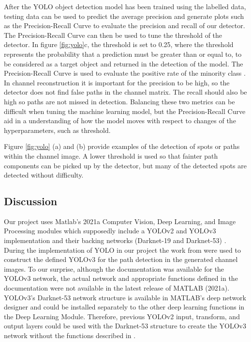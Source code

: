 After the YOLO object detection model has been trained using the labelled data, testing data can be used to predict the average precision and generate plots such as the Precision-Recall Curve to evaluate the precision and recall of our detector. The Precision-Recall Curve can then be used to tune the threshold of the detector. In figure \ref{fig:yolo}c, the threshold is set to 0.25, where the threshold represents the probability that a prediction must be greater than or equal to, to be considered as a target object and returned in the detection of the model. The Precision-Recall Curve is used to evaluate the positive rate of the minority class \cite{Burkov2019}. In channel reconstruction it is important for the precision to be high, so the detector does not find false paths in the channel matrix. The recall should also be high so paths are not missed in detection. Balancing these two metrics can be difficult when tuning the machine learning model, but the Precision-Recall Curve aid in a understanding of how the model moves with respect to changes of the hyperparameters, such as threshold.

Figure \ref{fig:yolo} (a) and (b) provide examples of the detection of spots or paths within the channel image. A lower threshold is used so that fainter path components can be picked up by the detector, but many of the detected spots are detected without difficulty.

\subsection{Discussion}

Our project uses Matlab's 2021a Computer Vision, Deep Learning, and Image Processing modules which supposedly include a YOLOv2 and YOLOv3 implementation and their backing networks (Darknet-19 and Darknet-53) \cite{Matlab2021a,Matlab2021b}. During the implementation of YOLO in our project the work from \cite{Li2020,Matlab2021a,Matlab2021b} were used to construct the defined YOLOv3 for the path detection in the generated channel images. To our surprise, although the documentation was available for the YOLOv3 network, the actual network and appropriate functions defined in the documentation were not available in the latest release of MATLAB (2021a). YOLOv3's Darknet-53 network structure is available in MATLAB's deep network designer and could be installed separately to the other deep learning functions in the Deep Learning Module. Therefore, previous YOLOv2 input, transform, and output layers could be used with the Darknet-53 structure to create the YOLOv3 network without the functions described in \cite{Matlab2021b}.


